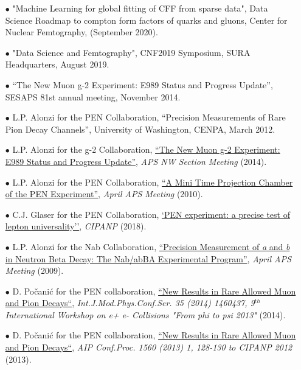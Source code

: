 \documentclass{article}[10pt]
\begin{document}
\begin{itemize}
\item [$\bullet$] "Machine Learning for global fitting of CFF from sparse data", Data Science Roadmap to compton form factors of quarks and gluons, Center for Nuclear Femtography, (September 2020).

\item [$\bullet$] "Data Science and Femtography", CNF2019 Symposium, SURA Headquarters, August 2019.

\item [$\bullet$] ``The New Muon g-2 Experiment: E989 Status and Progress Update'', SESAPS 81st annual meeting, November 2014.

\item [$\bullet$] L.P. Alonzi for the PEN Collaboration, ``Precision Measurements of Rare Pion Decay Channels'', University of Washington, CENPA, March 2012.

\item [$\bullet$] L.P. Alonzi for the g-2 Collaboration, \href{http://pen.phys.virginia.edu/lpa2a-docs/2014-05-02-Alonzi-APSNWSection.pdf}{``The New Muon g-2 Experiment: E989 Status and Progress Update''}, \emph{APS NW Section Meeting} (2014).

\item [$\bullet$] L.P. Alonzi for the PEN Collaboration, \href{http://pen.phys.virginia.edu/talks/2010_April_APS_alonzi.pdf}{``A Mini Time Projection Chamber of the PEN Experiment''}, \emph{April APS Meeting} (2010).

\item [$\bullet$] C.J. Glaser for the PEN Collaboration, \href{https://inspirehep.net/literature/1706145}{`PEN experiment: a precise test of lepton universality''}, \emph{CIPANP} (2018).

\item [$\bullet$] L.P. Alonzi for the Nab Collaboration, \href{http://nab.phys.virginia.edu/slides/2009_April_APS_Alonzi.pdf}{``Precision Measurement of \emph{a} and \emph{b} in Neutron Beta Decay: The Nab/abBA Experimental Program''}, \emph{April APS Meeting} (2009).

\item [$\bullet$] D. Po\v{c}ani\'c for the PEN collaboration, \href{https://inspirehep.net/literature/1287740}{``New Results in Rare Allowed Muon and Pion Decays``}, \emph{Int.J.Mod.Phys.Conf.Ser. 35 (2014) 1460437, 9$^{th}$ International Workshop on e+ e- Collisions "From phi to psi 2013"} (2014).

\item [$\bullet$] D. Po\v{c}ani\'c for the PEN collaboration, \href{https://inspirehep.net/literature/1191427}{``New Results in Rare Allowed Muon and Pion Decays``}, \emph{AIP Conf.Proc. 1560 (2013) 1, 128-130 to CIPANP 2012} (2013).


\end{itemize}
\end{document}
